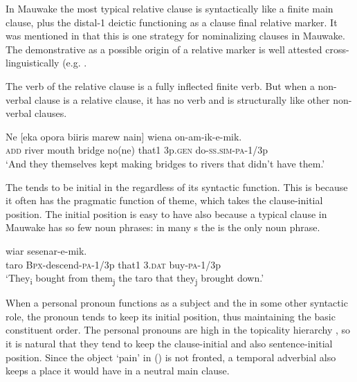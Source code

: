 In Mauwake the most typical relative clause is syntactically like a finite main clause, plus the distal-1 deictic  functioning as a clause final relative marker. It was mentioned in  that this is one strategy for nominalizing clauses in Mauwake. The demonstrative as a possible origin of a relative marker is well attested cross-linguistically (e.g. \citealt[342]{Dixon2010b}. 

The verb of the relative clause is a fully inflected finite verb. But when a non-verbal clause is a relative clause, it has no verb and is structurally like other non-verbal clauses. 

\ea%
\label{ex:x1943}
\gll Ne  [eka  opora  biiris  marew  nain]  wiena on-am-ik-e-mik.\\
\textsc{add} river  mouth  bridge  no(ne)  that1  3p.\textsc{gen} do-\textsc{ss}.\textsc{sim}-\textsc{pa}-1/3p\\
\glt`And they themselves kept making bridges to rivers that didn't have them.'
\z


The  tends to be initial in the  regardless of its syntactic function. This is because it often has the pragmatic function of theme, which takes the clause-initial position. The initial position is easy to have also because a typical clause in Mauwake has so few noun phrases: in many s the  is the only noun phrase. 

\ea%
\label{ex:x1552}
  wiar  sesenar-e-mik.\\
taro  \textsc{Bpx}-descend-\textsc{pa}-1/3p  that1  3.\textsc{dat} buy-\textsc{pa}-1/3p \\
\glt`They\textsubscript{i} bought from them\textsubscript{j} the taro that they\textsubscript{j} brought down.'
\z


When a personal pronoun functions as a subject and the  in some other syntactic role, the pronoun tends to keep its initial position, thus maintaining the basic constituent order. The personal pronouns are high in the topicality hierarchy \citep[166]{Givon1976}, so it is natural that they tend to keep the clause-initial and also sentence-initial position.  Since the object  `pain' in () is not fronted, a temporal adverbial also keeps a place it would have in a neutral main clause. 

